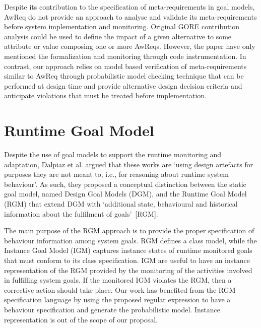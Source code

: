 Despite its contribution to the specification of meta-requirements in goal models, AwReq do not provide an approach to analyse and validate its meta-requirements before system implementation and monitoring. Original GORE contribution analysis could be used to define the impact of a given alternative to some attribute or value composing one or more AwReqs. However, the paper have only mentioned the formalization and monitoring through code instrumentation. In contrast, our approach relies on model based verification of meta-requirements similar to AwReq through probabilistic model checking technique that can be performed at design time and provide alternative design decision criteria and anticipate violations that must be treated before implementation. 

\section{Runtime Goal Model}

Despite the use of goal models to support the runtime monitoring and adaptation, Dalpiaz et al. argued that these works are `using design artefacts for purposes they are not meant to, i.e., for reasoning about runtime system behaviour'. As such, they proposed a conceptual distinction between the static goal model, named Design Goal Models (DGM), and the Runtime Goal Model (RGM) that extend DGM with `additional state, behavioural and historical information about the fulfilment of goals'~[RGM].

The main purpose of the RGM approach is to provide the proper specification of behaviour information among system goals. RGM defines a class model, while the Instance Goal Model (IGM) captures instance states of runtime monitored goals that must conform to its class specification. IGM are useful to have an instance representation of the RGM provided by the monitoring of the activities involved in fulfilling system goals. If the monitored IGM violates the RGM, then a corrective action should take place. Our work has benefited from the RGM specification language by using the proposed regular expression to have a behaviour specification and generate the probabilistic model. Instance representation is out of the scope of our proposal.


